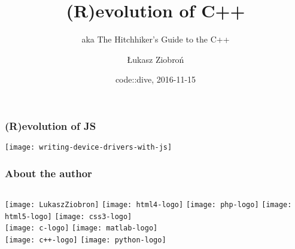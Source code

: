 \author{Łukasz Ziobroń}
\title[Crisis]{(R)evolution of C++}
\date{code::dive, 2016-11-15}
\subject{Computer Science}
\subtitle{aka The Hitchhiker's Guide to the C++}

\begin{frame}
\titlepage
\end{frame}

\begin{frame}
  \frametitle{(R)evolution of JS}
  \centering 
  \texttt{[image: writing-device-drivers-with-js]}
\end{frame}

\begin{frame}
  \frametitle{About the author}
  \begin{columns}
      \texttt{[image: LukaszZiobron]}
      \centering
      \texttt{[image: html4-logo]} \pause
      \texttt{[image: php-logo]} \pause
      \texttt{[image: html5-logo]}
      \texttt{[image: css3-logo]} \\ \pause
      \texttt{[image: c-logo]} \pause
      \texttt{[image: matlab-logo]} \\ \pause
      \texttt{[image: c++-logo]} \pause %
      \texttt{[image: python-logo]}
  \end{columns}
\end{frame}


